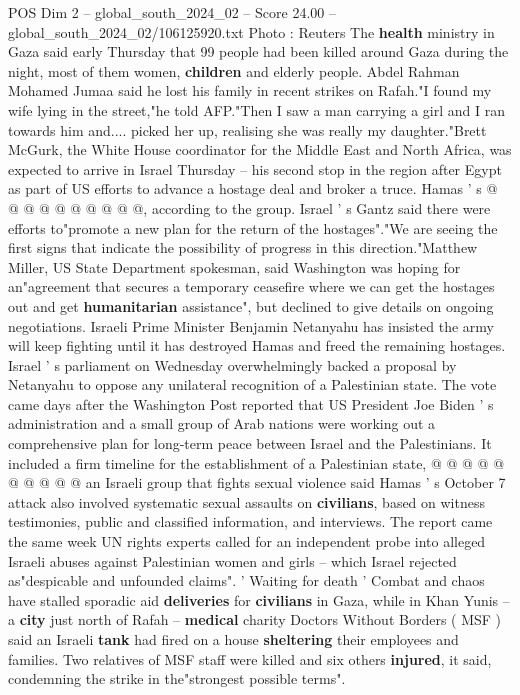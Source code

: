 \begin{textsample}{POS Dim 2 – global\_south\_2024\_02 – Score 24.00 – global\_south\_2024\_02/106125920.txt}
Photo : Reuters The \textbf{health} ministry in Gaza said early Thursday that 99 people had been killed around Gaza during the night, most of them women, \textbf{children} and elderly people.
Abdel Rahman Mohamed Jumaa said he lost his family in recent strikes on Rafah."I found my wife lying in the street,"he told AFP."Then I saw a man carrying a girl and I ran towards him and.... picked her up, realising she was really my daughter."Brett McGurk, the White House coordinator for the Middle East and North Africa, was expected to arrive in Israel Thursday -- his second stop in the region after Egypt as part of US efforts to advance a hostage deal and broker a truce.
Hamas ' s @ @ @ @ @ @ @ @ @ @, according to the group.
Israel ' s Gantz said there were efforts to"promote a new plan for the return of the hostages"."We are seeing the first signs that indicate the possibility of progress in this direction."Matthew Miller, US State Department spokesman, said Washington was hoping for an"agreement that secures a temporary ceasefire where we can get the hostages out and get \textbf{humanitarian} assistance", but declined to give details on ongoing negotiations.
Israeli Prime Minister Benjamin Netanyahu has insisted the army will keep fighting until it has destroyed Hamas and freed the remaining hostages.
Israel ' s parliament on Wednesday overwhelmingly backed a proposal by Netanyahu to oppose any unilateral recognition of a Palestinian state.
The vote came days after the Washington Post reported that US President Joe Biden ' s administration and a small group of Arab nations were working out a comprehensive plan for long-term peace between Israel and the Palestinians.
It included a firm timeline for the establishment of a Palestinian state, @ @ @ @ @ @ @ @ @ @ an Israeli group that fights sexual violence said Hamas ' s October 7 attack also involved systematic sexual assaults on \textbf{civilians}, based on witness testimonies, public and classified information, and interviews.
The report came the same week UN rights experts called for an independent probe into alleged Israeli abuses against Palestinian women and girls -- which Israel rejected as"despicable and unfounded claims". ' Waiting for death ' Combat and chaos have stalled sporadic aid \textbf{deliveries} for \textbf{civilians} in Gaza, while in Khan Yunis -- a \textbf{city} just north of Rafah -- \textbf{medical} charity Doctors Without Borders ( MSF ) said an Israeli \textbf{tank} had fired on a house \textbf{sheltering} their employees and families.
Two relatives of MSF staff were killed and six others \textbf{injured}, it said, condemning the strike in the"strongest possible terms".

\end{textsample}
